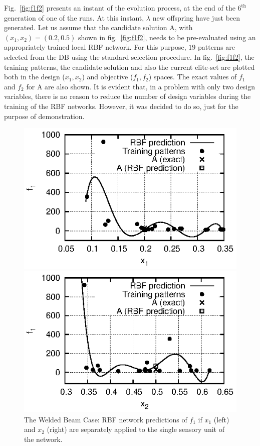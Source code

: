 Fig.\ \ref{fig:f1f2} presents an instant of the evolution process, at the end of the $6^{\mbox{th}}$ generation of one of the runs. At this instant, $\lambda$ new offspring have just been generated. Let us assume that the candidate solution A, with $(x_1, x_2)\!=\!(0.2,0.5)$  shown in fig.\ \ref{fig:f1f2}, needs to be pre-evaluated using an appropriately trained local RBF network. 
For this purpose, $19$ patterns are selected from the DB using the standard selection procedure. 
In fig.\ \ref{fig:f1f2}, the training patterns, the candidate solution and also the current elite-set are plotted both in the design ($x_1, x_2$) and objective ($f_1, f_2$) spaces. 
The exact values of $f_1$ and $f_2$ for A are also shown.
It is evident that, in a problem with only two design variables, there is no reason to reduce the number of design variables during the training of the RBF networks. However, it was decided to do so, just for the purpose of demonstration.  

\begin{figure}
\begin{minipage}{0.48\textwidth}
\includegraphics[scale=1.2]{IPE/f1_x1.eps}
\end{minipage}
\begin{minipage}{0.48\textwidth}
\includegraphics[scale=1.2]{IPE/f1_x2.eps}
\end{minipage}
\caption{The Welded Beam Case: RBF network predictions of $f_1$ if $x_1$ (left) and $x_2$ (right) are separately applied to the single sensory unit of the network. }
\label{fig:f1x1x2}
\end{figure}

